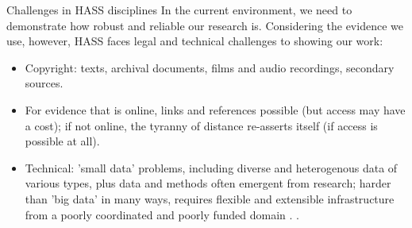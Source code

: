 \documentclass[aspectratio=169, 11pt]{beamer} %
\begin{document}
\begin{frame}{Challenges in HASS disciplines}
  In the current environment, we need to demonstrate how robust and reliable our research is. Considering the evidence we use, however, HASS faces legal and technical challenges to showing our work:
    \begin{itemize}[label=\textbullet]
        \item Copyright: texts, archival documents, films and audio recordings, secondary sources.
        \item For evidence that is online, links and references possible (but access may have a cost); if not online, the tyranny of distance re-asserts itself (if access is possible at all). 
        \item Technical: 'small data' problems, including diverse and heterogenous data of various types, plus data and methods often emergent from research; harder than 'big data' in many ways, requires flexible and extensible infrastructure from a poorly coordinated and poorly funded domain \cite{Borgman2015-rh}.
        \cite{Rda2019-wc}.
    \end{itemize}
\end{frame}
\end{document}
